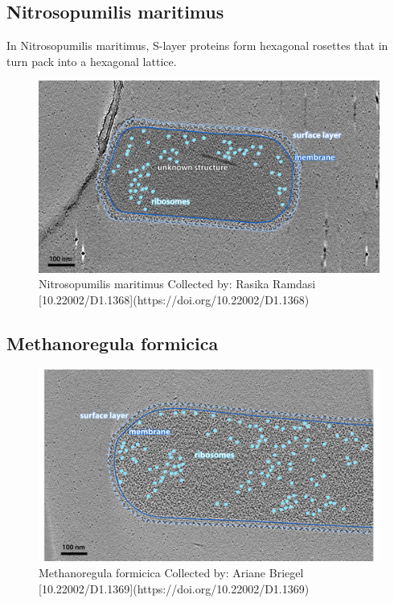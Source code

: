\documentclass[]{tufte-book}
\begin{document}
\hypertarget{N._maritimus}{\subsection{Nitrosopumilis
maritimus}\label{N._maritimus}}

In Nitrosopumilis maritimus, S-layer proteins form hexagonal rosettes
that in turn pack into a hexagonal lattice.

\begin{figure}
\includegraphics{img/2_7c_Nmaritimus} \caption[Nitrosopumilis maritimus Collected by]{Nitrosopumilis maritimus Collected by: Rasika Ramdasi [10.22002/D1.1368](https://doi.org/10.22002/D1.1368)}\label{fig:unnamed-chunk-22}
\end{figure}

\hypertarget{Methanoregula_formicica}{\subsection{Methanoregula
formicica}\label{Methanoregula_formicica}}

\begin{figure}
\includegraphics{img/2_7d_Mformicica} \caption[Methanoregula formicica Collected by]{Methanoregula formicica Collected by: Ariane Briegel [10.22002/D1.1369](https://doi.org/10.22002/D1.1369)}\label{fig:unnamed-chunk-23}
\end{figure}
\end{document}
